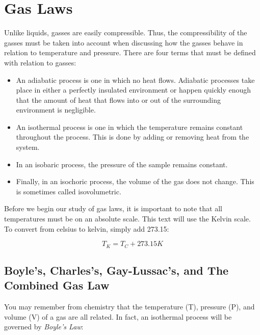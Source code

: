 \chapter{Gas Laws}
Unlike liquids, gasses are easily compressible.  Thus, the compressibility of the gasses must be taken into account when discussing how the gasses behave in relation to temperature and pressure.   There are four terms that must be defined with relation to gasses:
\begin{itemize}
	\item An \gls{adiabatic}  process is one in which no heat flows.  Adiabatic processes take place in either a perfectly insulated environment or happen quickly enough that the amount of heat that flows into or out of the surrounding environment is negligible. 
	
	\item An \gls{isothermal}  process is one in which the temperature remains constant throughout the process.  This is done by adding or removing heat from the system.  
	
	\item In an \gls{isobaric}  process, the pressure of the sample remains constant.  
	
	\item Finally, in an \gls{isochoric}  process, the volume of the gas does not change.  This is sometimes called isovolumetric. 
	\end{itemize}
	
Before we begin our study of gas laws, it is important to note that all temperatures must be on an absolute scale.  This text will use the Kelvin scale.   To convert from celsius to kelvin, simply add 273.15: 
	
		\begin{mdframed}[backgroundcolor=orange!20!white]
		\begin{equation}
			T_K = T_C + 273.15\si{K}
			\label{equation:celsiuskelvinconvertion}
		\end{equation}
	\end{mdframed}	


	\section{Boyle's, Charles's, Gay-Lussac's, and The Combined Gas Law}
	You may remember from chemistry that the temperature (T), pressure (P), and volume (V) of a gas are all related.  In fact, an isothermal process will be governed by \textit{Boyle's Law}: 
	

